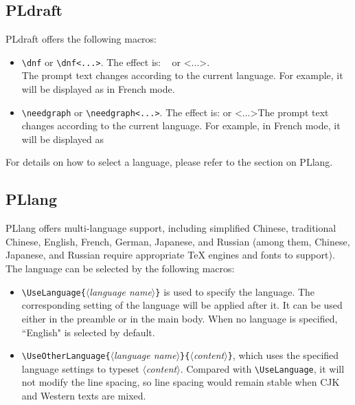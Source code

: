 \documentclass[allowbf]{lebhart}
\providecommand{\meta}[1]{$\langle${\normalfont\itshape#1}$\rangle$}
\providecommand{\PLdraft}{\textsf{PLdraft}}
\providecommand{\PLlang}{\textsf{PLlang}}
\begin{document}
\subsection{PLdraft}

\PLdraft{} offers the following macros:
\begin{itemize}
    \item \lstinline|\dnf| or \lstinline|\dnf<...>|. The effect is: \dnf~ or \dnf<...>. \\The prompt text changes according to the current language. For example, it will be displayed as  in French mode.
    \item \lstinline|\needgraph| or \lstinline|\needgraph<...>|. The effect is: \needgraph or \needgraph<...>The prompt text changes according to the current language. For example, in French mode, it will be displayed as 
\end{itemize}

For details on how to select a language, please refer to the section on \PLlang{}.

\subsection{PLlang}

\PLlang{} offers multi-language support, including simplified Chinese, traditional Chinese, English, French, German, Japanese, and Russian (among them, Chinese, Japanese, and Russian require appropriate \TeX{} engines and fonts to support). The language can be selected by the following macros:

\begin{itemize}
    \item \lstinline|\UseLanguage{|\meta{language name}\lstinline|}| is used to specify the language. The corresponding setting of the language will be applied after it. It can be used either in the preamble or in the main body. When no language is specified, ``English" is selected by default.
    \item \lstinline|\UseOtherLanguage{|\meta{language name}\lstinline|}{|\meta{content}\lstinline|}|, which uses the specified language settings to typeset \meta{content}. Compared with \lstinline|\UseLanguage|, it will not modify the line spacing, so line spacing would remain stable when CJK and Western texts are mixed.
\end{itemize}
\end{document}
